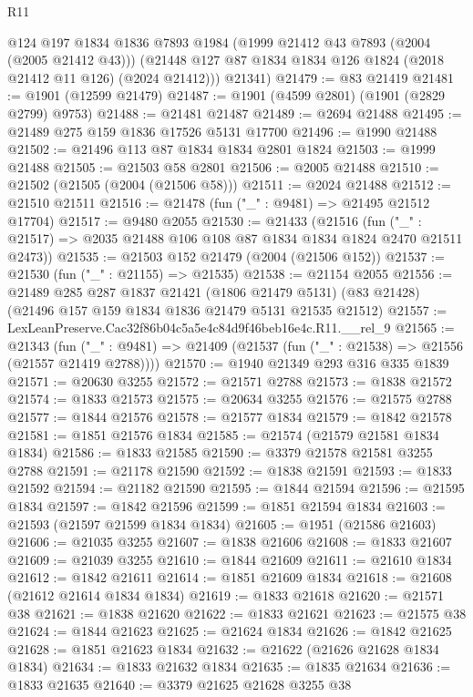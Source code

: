 \begin{lexlean}{R11}
\begin{coremodule}
        @124
        @197
        @1834
        @1836
        @7893
        @1984
        (@1999 @21412 @43 @7893 (@2004 (@2005 @21412 @43)))
        (@21448 @127 @87 @1834 @1834 @126 @1824 (@2018 @21412 @11 @126) (@2024 @21412)))
      @21341)
@21479 := @83 @21419
@21481 := @1901 (@12599 @21479)
@21487 := @1901 (@4599 @2801) (@1901 (@2829 @2799) @9753)
@21488 := @21481 @21487
@21489 := @2694 @21488
@21495 := @21489 @275 @159 @1836 @17526 @5131 @17700
@21496 := @1990 @21488
@21502 := @21496 @113 @87 @1834 @1834 @2801 @1824
@21503 := @1999 @21488
@21505 := @21503 @58 @2801
@21506 := @2005 @21488
@21510 := @21502 (@21505 (@2004 (@21506 @58)))
@21511 := @2024 @21488
@21512 := @21510 @21511
@21516 := @21478 (fun ("_" : @9481) => @21495 @21512 @17704)
@21517 := @9480 @2055
@21530 := @21433
    (@21516 (fun ("_" : @21517) => @2035 @21488 @106 @108 @87 @1834 @1834 @1824 @2470 @21511 @2473))
@21535 := @21503 @152 @21479 (@2004 (@21506 @152))
@21537 := @21530 (fun ("_" : @21155) => @21535)
@21538 := @21154 @2055
@21556 := @21489
    @285
    @287
    @1837
    @21421
    (@1806 @21479 @5131)
    (@83 @21428)
    (@21496 @157 @159 @1834 @1836 @21479 @5131 @21535 @21512)
@21557 := LexLeanPreserve.Cac32f86b04c5a5e4c84d9f46beb16e4c.R11.__rel_9
@21565 := @21343
    (fun ("_" : @9481) => @21409 (@21537 (fun ("_" : @21538) => @21556 (@21557 @21419 @2788))))
@21570 := @1940 @21349 @293 @316 @335 @1839
@21571 := @20630 @3255
@21572 := @21571 @2788
@21573 := @1838 @21572
@21574 := @1833 @21573
@21575 := @20634 @3255
@21576 := @21575 @2788
@21577 := @1844 @21576
@21578 := @21577 @1834
@21579 := @1842 @21578
@21581 := @1851 @21576 @1834
@21585 := @21574 (@21579 @21581 @1834 @1834)
@21586 := @1833 @21585
@21590 := @3379 @21578 @21581 @3255 @2788
@21591 := @21178 @21590
@21592 := @1838 @21591
@21593 := @1833 @21592
@21594 := @21182 @21590
@21595 := @1844 @21594
@21596 := @21595 @1834
@21597 := @1842 @21596
@21599 := @1851 @21594 @1834
@21603 := @21593 (@21597 @21599 @1834 @1834)
@21605 := @1951 (@21586 @21603)
@21606 := @21035 @3255
@21607 := @1838 @21606
@21608 := @1833 @21607
@21609 := @21039 @3255
@21610 := @1844 @21609
@21611 := @21610 @1834
@21612 := @1842 @21611
@21614 := @1851 @21609 @1834
@21618 := @21608 (@21612 @21614 @1834 @1834)
@21619 := @1833 @21618
@21620 := @21571 @38
@21621 := @1838 @21620
@21622 := @1833 @21621
@21623 := @21575 @38
@21624 := @1844 @21623
@21625 := @21624 @1834
@21626 := @1842 @21625
@21628 := @1851 @21623 @1834
@21632 := @21622 (@21626 @21628 @1834 @1834)
@21634 := @1833 @21632 @1834
@21635 := @1835 @21634
@21636 := @1833 @21635
@21640 := @3379 @21625 @21628 @3255 @38

\end{coremodule}
\end{lexlean}
